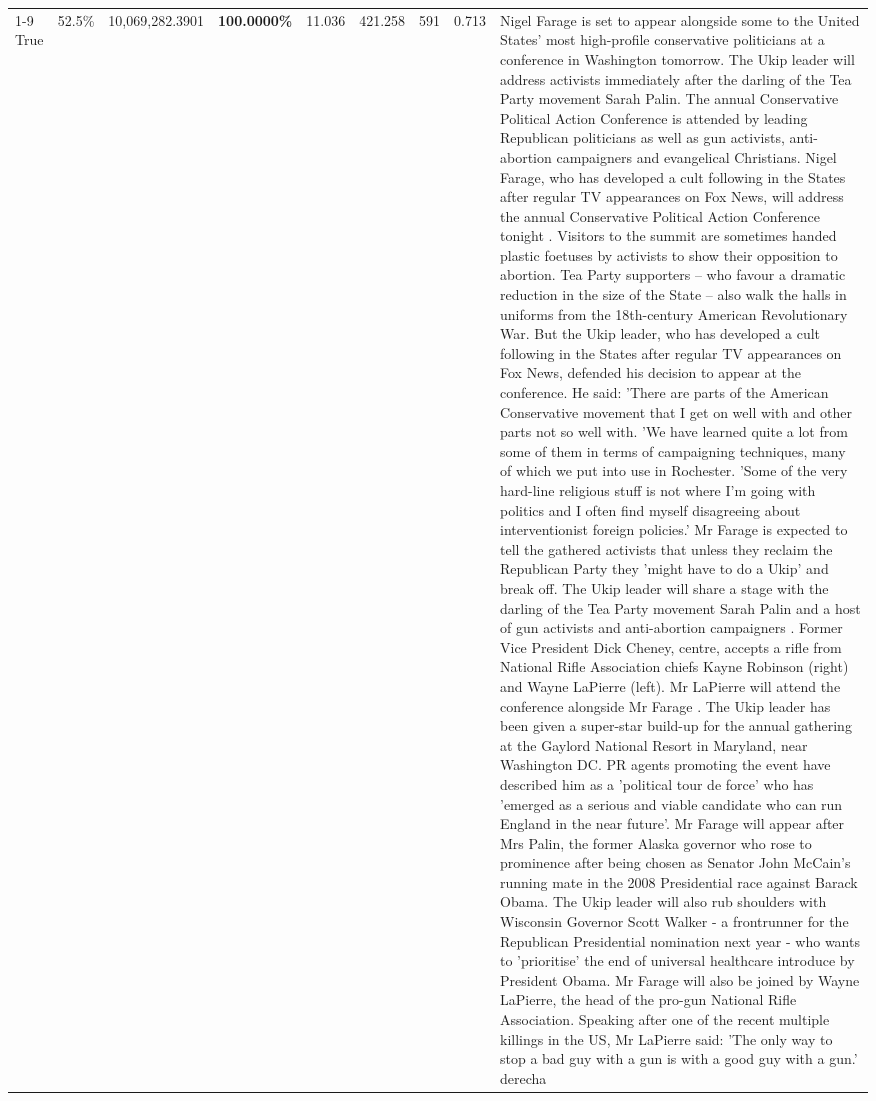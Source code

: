 \begin{table}[H]
\begin{tabular}{lllrlllll}
\cline{1-9}
True & 52.5\% & 10,069,282.3901 & \bfseries \color{red} 100.0000\% & 11.036 & 421.258 & 591 & 0.713 & Nigel Farage is set to appear alongside some to the United States' most high-profile conservative politicians at a conference in Washington tomorrow. The Ukip leader will address activists immediately after the darling of the Tea Party movement Sarah Palin. The annual Conservative Political Action Conference is attended by leading Republican politicians as well as gun activists, anti-abortion campaigners and evangelical Christians. Nigel Farage, who has developed a cult following in the States after regular TV appearances on Fox News, will address the annual Conservative Political Action Conference tonight . Visitors to the summit are sometimes handed plastic foetuses by activists to show their opposition to abortion. Tea Party supporters – who favour a dramatic reduction in the size of the State – also walk the halls in uniforms from the 18th-century American Revolutionary War. But the Ukip leader, who has developed a cult following in the States after regular TV appearances on Fox News, defended his decision to appear at the conference. He said: 'There are parts of the American Conservative movement that I get on well with and other parts not so well with. 'We have learned quite a lot from some of them in terms of campaigning techniques, many of which we put into use in Rochester. 'Some of the very hard-line religious stuff is not where I'm going with politics and I often find myself disagreeing about interventionist foreign policies.' Mr Farage is expected to tell the gathered activists that unless they reclaim the Republican Party they 'might have to do a Ukip' and break off. The Ukip leader will share a stage with the darling of the Tea Party movement Sarah Palin and a host of gun activists and anti-abortion campaigners . Former Vice President Dick Cheney, centre, accepts a rifle from National Rifle Association chiefs Kayne Robinson (right) and Wayne LaPierre (left). Mr LaPierre will attend the conference alongside Mr Farage . The Ukip leader has been given a super-star build-up for the annual gathering at the Gaylord National Resort in Maryland, near Washington DC. PR agents promoting the event have described him as a 'political tour de force' who has 'emerged as a serious and viable candidate who can run England in the near future'. Mr Farage will appear after Mrs Palin, the former Alaska governor who rose to prominence after being chosen as Senator John McCain's running mate in the 2008 Presidential race against Barack Obama. The Ukip leader will also rub shoulders with Wisconsin Governor Scott Walker - a frontrunner for the Republican Presidential nomination next year - who wants to 'prioritise' the end of universal healthcare introduce by President Obama. Mr Farage will also be joined by Wayne LaPierre, the head of the pro-gun National Rifle Association. Speaking after one of the recent multiple killings in the US, Mr LaPierre said: 'The only way to stop a bad guy with a gun is with a good guy with a gun.' derecha \\

\end{tabular}
\end{table}
